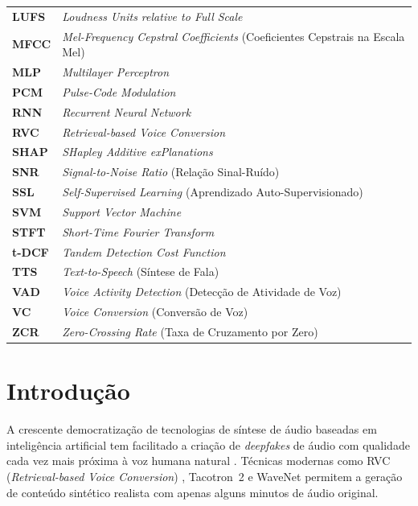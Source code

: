 \documentclass[12pt,a4paper]{article}
\begin{document}
\begin{singlespace}
\begin{tabular}{p{2.5cm}p{12cm}}
\textbf{LUFS}     & \textit{Loudness Units relative to Full Scale} \\
\textbf{MFCC}     & \textit{Mel-Frequency Cepstral Coefficients} (Coeficientes Cepstrais na Escala Mel) \\
\textbf{MLP}      & \textit{Multilayer Perceptron} \\
\textbf{PCM}      & \textit{Pulse-Code Modulation} \\
\textbf{RNN}      & \textit{Recurrent Neural Network} \\
\textbf{RVC}      & \textit{Retrieval-based Voice Conversion} \\
\textbf{SHAP}     & \textit{SHapley Additive exPlanations} \\
\textbf{SNR}      & \textit{Signal-to-Noise Ratio} (Relação Sinal-Ruído) \\
\textbf{SSL}      & \textit{Self-Supervised Learning} (Aprendizado Auto-Supervisionado) \\
\textbf{SVM}      & \textit{Support Vector Machine} \\
\textbf{STFT}     & \textit{Short-Time Fourier Transform} \\
\textbf{t-DCF}    & \textit{Tandem Detection Cost Function} \\
\textbf{TTS}      & \textit{Text-to-Speech} (Síntese de Fala) \\
\textbf{VAD}      & \textit{Voice Activity Detection} (Detecção de Atividade de Voz) \\
\textbf{VC}       & \textit{Voice Conversion} (Conversão de Voz) \\
\textbf{ZCR}      & \textit{Zero-Crossing Rate} (Taxa de Cruzamento por Zero) \\
\end{tabular}
\end{singlespace}

\newpage
\tableofcontents
\newpage

\section{Introdução}
\label{sec:introducao}

A crescente democratização de tecnologias de síntese de áudio baseadas em
inteligência artificial tem facilitado a criação de \textit{deepfakes} de
áudio com qualidade cada vez mais próxima à voz humana natural
\cite{muller2022warning, heidari2024deepfake}. Técnicas modernas como RVC
(\textit{Retrieval-based Voice Conversion}) \cite{bird2023realtime},
Tacotron~2 \cite{shen2018natural} e WaveNet \cite{oord2016wavenet} permitem a
geração de conteúdo sintético realista com apenas alguns minutos de áudio
original.
\end{document}
